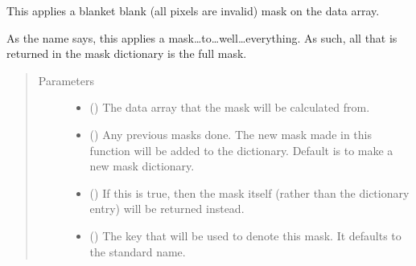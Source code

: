 \documentclass[letterpaper,10pt,english]{sphinxmanual}
\begin{document}
\begin{fulllineitems}
\label{\detokenize{python_docstrings/IfA_Smeargle.echo.masks.masks_echo300:IfA_Smeargle.echo.masks.masks_echo300.echo399_everything}}
This applies a blanket blank (all pixels are invalid) mask on the
data array.

As the name says, this applies a mask…to…well…everything. As such,
all that is returned in the mask dictionary is the full mask.
\begin{quote}\begin{description}
\item[{Parameters}] \leavevmode\begin{itemize}
\item {} 
 () \textendash{} The data array that the mask will be calculated from.

\item {} 
 (\sphinxstyleliteralemphasis{\sphinxupquote{ (}}\sphinxstyleliteralemphasis{\sphinxupquote{)}}) \textendash{} Any previous masks done. The new mask made in this function will be
added to the dictionary. Default is to make a new mask dictionary.

\item {} 
 (\sphinxstyleliteralemphasis{\sphinxupquote{ (}}\sphinxstyleliteralemphasis{\sphinxupquote{)}}) \textendash{} If this is true, then the mask itself (rather than the dictionary
entry) will be returned instead.

\item {} 
 (\sphinxstyleliteralemphasis{\sphinxupquote{ (}}\sphinxstyleliteralemphasis{\sphinxupquote{)}}) \textendash{} The key that will be used to denote this mask. It defaults to the
standard name.


\end{itemize}
\end{description}
\end{quote}
\end{fulllineitems}
\end{document}
